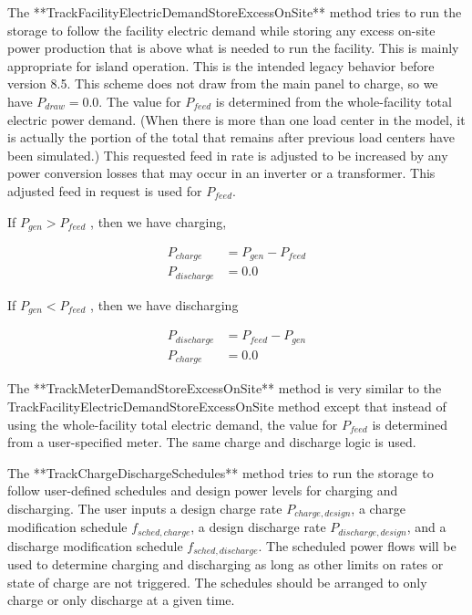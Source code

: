 The **TrackFacilityElectricDemandStoreExcessOnSite** method tries to run the storage to follow the facility electric demand while storing any excess on-site power production that is above what is needed to run the facility.  This is mainly appropriate for island operation.  This is the intended legacy behavior before version 8.5.  This scheme does not draw from the main panel to charge, so we have  $ {P_{draw}} = 0.0  $.  The value for $ {P_{feed}}  $ is determined from the whole-facility total electric power demand.  (When there is more than one load center in the model, it is actually the portion of the total that remains after previous load centers have been simulated.)  This requested feed in rate is adjusted to be increased by any power conversion losses that may occur in an inverter or a transformer.  This adjusted feed in request is used for $ {P_{feed}}  $. 

If $ {P_{gen}} > {P_{feed}} $ ,  then we have charging, 

\begin{equation}
  \begin{array}{rl}
    {P_{charge}} &= {P_{gen}} - {P_{feed}} \\
    {P_{discharge}} &= 0.0
  \end{array}
\end{equation}

If $ {P_{gen}} < {P_{feed}} $ , then we have discharging

\begin{equation}
  \begin{array}{rl}
    {P_{discharge}} &=  {P_{feed}} - {P_{gen}} \\
    {P_{charge}} &= 0.0
  \end{array}
\end{equation}

The **TrackMeterDemandStoreExcessOnSite** method is very similar to the TrackFacilityElectricDemandStoreExcessOnSite method except that instead of using the whole-facility total electric demand, the value for $ {P_{feed}}  $ is determined from a user-specified meter.  The same charge and discharge logic is used. 

The **TrackChargeDischargeSchedules** method tries to run the storage to follow user-defined schedules and design power levels for charging and discharging.  The user inputs a design charge rate $ {P_{charge,design}} $, a charge modification schedule $ {f_{sched,charge}} $, a design discharge rate $ {P_{discharge,design}} $, and a discharge modification schedule $ {f_{sched,discharge}} $.  The scheduled power flows will be used to determine charging and discharging as long as other limits on rates or state of charge are not triggered.  The schedules should be arranged to only charge or only discharge at a given time.  

